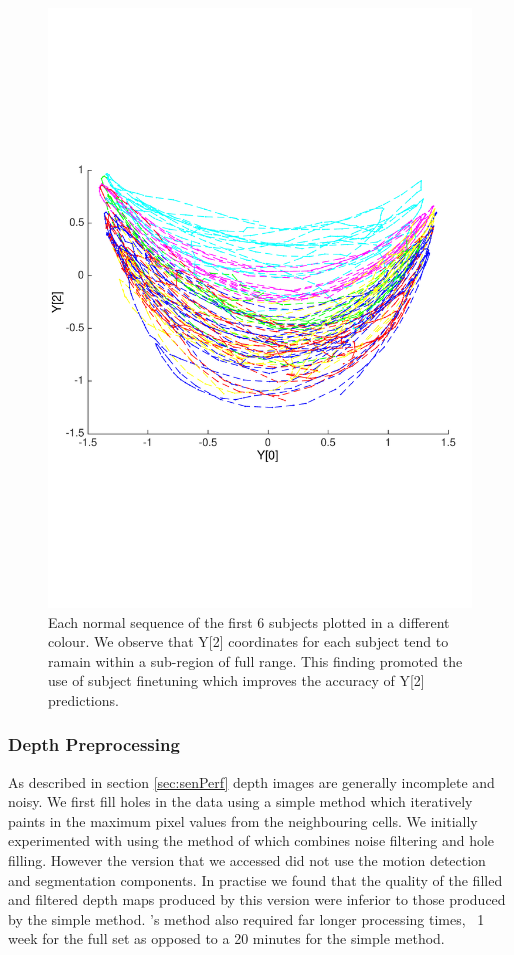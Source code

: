 \documentclass[11pt]{article} %
\begin{document}
\begin{figure}
\centering
\includegraphics*[trim={0 5cm 0 7cm},clip,width=0.75\linewidth,clip]{subjectsOnManifold.pdf} 
\caption{Each normal sequence of the first 6 subjects plotted in a different colour. We observe that Y[2] coordinates for each subject tend to ramain within a sub-region of full range. This finding promoted the use of subject finetuning which improves the accuracy of Y[2] predictions. }
\label{fig:subjectsOnManifold}
\end{figure}













\subsubsection{Depth Preprocessing}

As described in section \ref{sec:senPerf} depth images are generally incomplete and noisy. We first fill holes in the data using a simple method which iteratively paints in the maximum pixel values from the neighbouring cells. We initially experimented with using the method of \cite{Camplani2012a} which combines noise filtering and hole filling. However the version that we accessed did not use the motion detection and segmentation components. In practise we found that the quality of the filled and filtered depth maps produced by this version were inferior to those produced by the simple method.  \cite{Camplani2012a}'s method also required far longer processing times, ~1 week for the full set as opposed to a 20 minutes for the simple method. 
\end{document}
